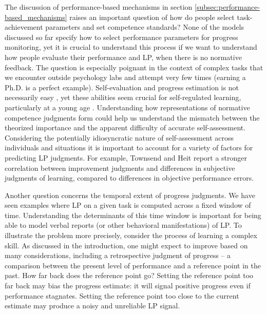 The discussion of performance-based mechanisms in section \autoref{subsec:performance-based_mechanisms} raises an important question of how do people select task-achievement parameters and set competence standards? None of the models discussed so far specify how to select performance parameters for progress monitoring, yet it is crucial to understand this process if we want to understand how people evaluate their performance and \ac{LP}, when there is no normative feedback. The question is especially poignant in the context of complex tasks that we encounter outside psychology labs and attempt very few times (earning a Ph.D. is a perfect example). Self-evaluation and progress estimation is not necessarily easy \cite{townsend_judgments_2011,raaijmakers_effects_2019}, yet these abilities seem crucial for self-regulated learning, particularly at a young age \cite{oudeyer_computational_2018}. Understanding how representations of normative competence judgments form could help us understand the mismatch between the theorized importance and the apparent difficulty of accurate self-assessment. Considering the potentially idiosyncratic nature of self-assessment across individuals and situations \cite{boekaerts_subjective_1991} it is important to account for a variety of factors for predicting \ac{LP} judgments. For example, Townsend and Heit \cite{townsend_judgments_2011} report a stronger correlation between improvement judgments and differences in subjective judgments of learning, compared to differences in objective performance errors.

Another question concerns the temporal extent of progress judgments. We have seen examples where \ac{LP} on a given task is computed across a fixed window of time. Understanding the determinants of this time window is important for being able to model verbal reports (or other behavioral manifestations) of \ac{LP}. To illustrate the problem more precisely, consider the process of learning a complex skill. As discussed in the introduction, one might expect to improve based on many considerations, including a retrospective judgment of progress -- a comparison between the present level of performance and a reference point in the past. How far back does the reference point go? Setting the reference point too far back may bias the progress estimate: it will signal positive progress even if performance stagnates. Setting the reference point too close to the current estimate may produce a noisy and unreliable 
\ac{LP} signal. 

